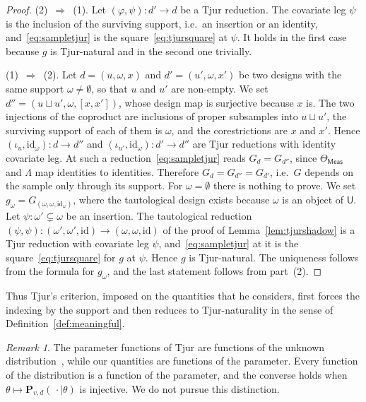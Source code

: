 \documentclass[11pt,a4paper]{article}
\theoremstyle{plain}
\theoremstyle{definition}
\theoremstyle{remark}
\newtheorem{remark}[theorem]{Remark}
\newcommand{\cat}[1]{\mathsf{#1}}
\newcommand{\catU}{\cat{U}}
\newcommand{\Meas}{\cat{Meas}}
\newcommand{\id}{\mathrm{id}}
\begin{document}
\begin{proof}
(2)~$\Rightarrow$~(1). Let $(\varphi,\psi) \colon d' \to d$ be a Tjur
reduction. The covariate leg $\psi$ is the inclusion of the surviving support,
i.e.\ an insertion or an identity, and~\eqref{eq:sampletjur} is the
square~\eqref{eq:tjursquare} at $\psi$. It holds in the first case because $g$
is Tjur-natural and in the second one trivially.

(1)~$\Rightarrow$~(2). Let $d = (u,\omega,x)$ and $d' = (u',\omega,x')$ be two
designs with the same support $\omega \neq \emptyset$, so that $u$ and $u'$
are non-empty. We set $d'' = (u \sqcup u',\omega,[x,x'])$, whose design map is
surjective because $x$ is. The two injections of the coproduct are inclusions
of proper subsamples into $u \sqcup u'$, the surviving support of each of them
is $\omega$, and the corestrictions are $x$ and $x'$. Hence
$(\iota_{u},\id_{\omega}) \colon d \to d''$ and
$(\iota_{u'},\id_{\omega}) \colon d' \to d''$ are Tjur reductions with
identity covariate leg. At such a reduction~\eqref{eq:sampletjur} reads
$G_{d} = G_{d''}$, since $\Theta_\Meas$ and $\Lambda$ map identities to
identities. Therefore $G_{d} = G_{d''} = G_{d'}$, i.e.\ $G$ depends on the
sample only through its support. For $\omega = \emptyset$ there is nothing to
prove. We set $g_{\omega} = G_{(\omega,\omega,\id_{\omega})}$, where the
tautological design exists because $\omega$ is an object of $\catU$. Let
$\psi \colon \omega' \subsetneq \omega$ be an insertion. The tautological
reduction $(\psi,\psi) \colon (\omega',\omega',\id) \to (\omega,\omega,\id)$
of the proof of Lemma~\ref{lem:tjurshadow} is a Tjur reduction with covariate
leg $\psi$, and~\eqref{eq:sampletjur} at it is the
square~\eqref{eq:tjursquare} for $g$ at $\psi$. Hence $g$ is Tjur-natural. The
uniqueness follows from the formula for $g_{\omega}$, and the last statement
follows from part~(2).
\end{proof}

Thus Tjur's criterion, imposed on the quantities that he considers, first
forces the indexing by the support and then reduces to Tjur-naturality in the
sense of Definition~\ref{def:meaningful}.

\begin{remark}\label{rem:distribution}
The parameter functions of Tjur are functions of the unknown
distribution~\cite[p.~1299]{tjur_discussion_2002}, while our quantities are
functions of the parameter. Every function of the distribution is a function
of the parameter, and the converse holds when
$\theta \mapsto \mathbf P_{v,d}(\,\cdot \mid \theta)$ is injective. We do not
pursue this distinction.
\end{remark}
\end{document}
